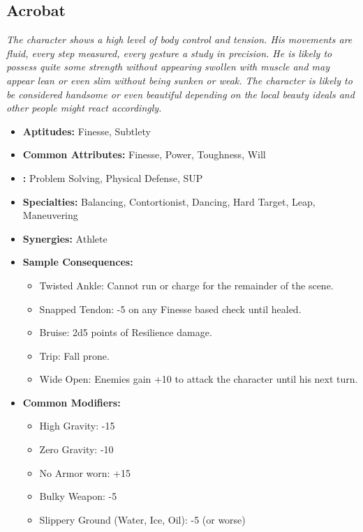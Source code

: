\subsection{Acrobat}\label{Acrobat}
\textit{The character shows a high level of body control and tension. 
His movements are fluid, every step measured, every gesture a study in precision.
He is likely to possess quite some strength without appearing swollen with muscle and may appear lean or even slim without being sunken or weak.
The character is likely to be considered handsome or even beautiful depending on the local beauty ideals and other people might react accordingly.}
\begin{itemize}
	\item \textbf{Aptitudes:} Finesse, Subtlety
	\item \textbf{Common Attributes:} Finesse, Power, Toughness, Will
	\item \textbf{:} Problem Solving, Physical Defense, SUP	
	\item \textbf{Specialties:} Balancing, Contortionist, Dancing, Hard Target, Leap, Maneuvering
	\item \textbf{Synergies:} Athlete
	\item \textbf{Sample Consequences:} 
	\begin{itemize}
		\item Twisted Ankle: Cannot run or charge for the remainder of the scene.
		\item Snapped Tendon: -5 on any Finesse based check until healed.
		\item Bruise: 2d5 points of Resilience damage.
		\item Trip: Fall prone.
		\item Wide Open: Enemies gain +10 to attack the character until his next turn.
	\end{itemize}
	\item \textbf{Common Modifiers:}
	\begin{itemize}
		\item High Gravity: -15
		\item Zero Gravity: -10
		\item No Armor worn: +15
		\item Bulky Weapon: -5
		\item Slippery Ground (Water, Ice, Oil): -5 (or worse)
	\end{itemize}
\end{itemize}

